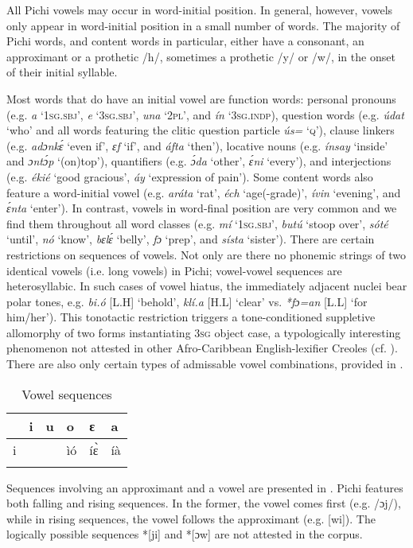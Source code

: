 All Pichi vowels may occur in word-initial position. In general, however, vowels only appear in word-initial position in a small number of words. The majority of Pichi words, and content words in particular, either have a consonant, an approximant or a prothetic /h/, sometimes a prothetic /y/ or /w/, in the onset of their initial syllable. 


Most words that do have an initial vowel are function words: personal pronouns (e.g. \textit{a} ‘\textsc{1sg.sbj}’, \textit{e} ‘\textsc{3sg.sbj}’, \textit{una} ‘\textsc{2pl}’, and \textit{ín} ‘\textsc{3sg.indp}), question words (e.g. \textit{údat} ‘who’ and all words featuring the clitic question particle \textit{ús=} ‘\textsc{q}’), clause linkers (e.g. \textit{adɔnkɛ́} ‘even if’, \textit{ɛf} ‘if’, and \textit{áfta} ‘then’), locative nouns{\fff} (e.g. \textit{ínsay} ‘inside’ and \textit{ɔntɔ́p} ‘(on)top’), quantifiers (e.g. \textit{ɔ́da} ‘other’, \textit{ɛ́ni} ‘every’), and interjections (e.g. \textit{ékié} ‘good gracious’, \textit{áy} ‘expression of pain’). Some content words also feature a word-initial vowel (e.g. \textit{aráta} ‘rat’, \textit{éch} ‘age(-grade)’, \textit{ívin} ‘evening’, and \textit{ɛ́nta} ‘enter’). In contrast, vowels in word-final position are very common and we find them throughout all word classes (e.g. \textit{mí} ‘\textsc{1sg.sbj}’, \textit{butú} ‘stoop over’, \textit{sóté} ‘until’, \textit{nó} ‘know’, \textit{bɛlɛ́} ‘belly’, \textit{fɔ} ‘prep’, and \textit{sísta} ‘sister’). There are certain restrictions on sequences of vowels. Not only are there no phonemic strings of two identical vowels (i.e. long vowels) in Pichi; vowel-vowel sequences are heterosyllabic. In such cases of vowel hiatus, the immediately adjacent nuclei bear polar tones, e.g. \textit{bi.ó} [L.H] ‘behold’, \textit{klí.a} [H.L] ‘clear’ vs. \textit{*fɔ=an} [L.L] ‘for him/her’). This tonotactic restriction triggers a tone-conditioned suppletive allomorphy of two forms instantiating \textsc{3sg} object case, a typologically interesting phenomenon not attested in other Afro-Caribbean English-lexifier Creoles (cf. ). There are also only certain types of admissable vowel combinations, provided in .


\begin{table}
\caption{Vowel sequences}
\label{tab:key:2.9}

\begin{tabularx}{\textwidth}{XXXXXX}
\lsptoprule
 & i & u & o & ɛ & a\\
 \midrule
i &  &  & ìó & íɛ̀ & íà\\
\lspbottomrule
\end{tabularx}
\end{table}
Sequences involving an approximant and a vowel are presented in . Pichi features both falling and rising sequences. In the former, the vowel comes first (e.g. /ɔj/), while in rising sequences, the vowel follows the approximant (e.g. [wi]). The logically possible sequences *[ji] and *[ɔw] are not attested in the corpus.

